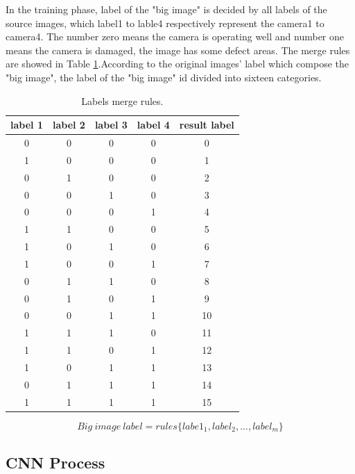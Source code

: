 \documentclass[sensors,article,submit,moreauthors,pdftex,10pt,a4paper]{mdpi}
\begin{document}
In the training phase, label of the "big image" is decided by all labels of the source images, which label1 to lable4 respectively represent the camera1 to camera4. The number zero means the camera is operating well and number one means the camera is damaged, the image has some defect areas. The merge rules are showed in Table \ref{LabelsMergeRules}.According to the original images' label which compose the "big image", the label of the "big image" id divided into sixteen categories.

\begin{table}[H]
\caption{Labels merge rules.}
\centering
\begin{tabular}{cccc|c}
\toprule
\textbf{label 1}	& \textbf{label 2}	& \textbf{label 3}	& \textbf{label 4}	& \textbf{result label}\\
\midrule
0		& 0			& 0				&0					&0\\
1		& 0			& 0				&0					&1\\
0		& 1			& 0				&0					&2\\
0		& 0			& 1				&0					&3\\
0		& 0			& 0				&1					&4\\
1		& 1			& 0				&0					&5\\
1		& 0			& 1				&0					&6\\
1		& 0			& 0				&1					&7\\
0		& 1			& 1				&0					&8\\
0		& 1			& 0				&1					&9\\
0		& 0			& 1				&1					&10\\
1		& 1			& 1				&0					&11\\
1		& 1			& 0				&1					&12\\
1		& 0			& 1				&1					&13\\
0		& 1			& 1				&1					&14\\
1		& 1			& 1				&1					&15\\
\bottomrule
\end{tabular}
\label{LabelsMergeRules}
\end{table}

\begin{equation}
Big\ image\ label = rules\{labe1_1, label_2, ..., label_m\}
\end{equation}

\subsection{CNN Process}
 
\end{document}
